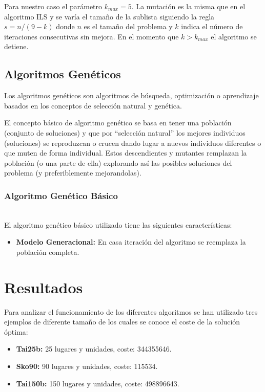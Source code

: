 \documentclass[runningheads,a4paper]{llncs}
\begin{document}
Para nuestro caso el parámetro $k_{max} = 5$. La mutación es la misma que en el algoritmo ILS y se varía el tamaño de la sublista siguiendo la regla $s = n/(9-k)$ donde $n$ es el tamaño del problema y $k$ indica el número de iteraciones consecutivas sin mejora. En el momento que $k > k_{max}$ el algoritmo se detiene.

\subsection{Algoritmos Genéticos}

Los algoritmos genéticos son algoritmos de búsqueda, optimización o aprendizaje basados en los conceptos de selección natural y genética.

El concepto básico de algoritmo genético se basa en tener una población (conjunto de soluciones) y que por ``selección natural'' los mejores individuos (soluciones) se reproduzcan o crucen dando lugar a nuevos individuos diferentes o que muten de forma individual. Estos descendientes y mutantes remplazan la población (o una parte de ella) explorando así las posibles soluciones del problema (y preferiblemente mejorandolas).

\subsubsection{Algoritmo Genético Básico}
~\\

El algoritmo genético básico utilizado tiene las siguientes características:

\begin{itemize}
\item \textbf{Modelo Generacional:} En casa iteración del algoritmo se reemplaza la población completa. 
\end{itemize}


\newpage
\section{Resultados}
Para analizar el funcionamiento de los diferentes algoritmos se han utilizado tres ejemplos de diferente tamaño de los cuales se conoce el coste de la solución óptima:

\begin{itemize}
\item \textbf{Tai25b:} 25 lugares y unidades, coste: 344355646.
\item \textbf{Sko90:} 90 lugares y unidades, coste: 115534.
\item \textbf{Tai150b:} 150 lugares y unidades, coste: 498896643.
\end{itemize}
\end{document}
